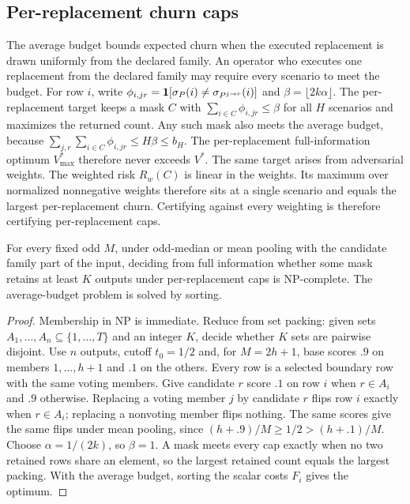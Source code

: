 \subsection{Per-replacement churn caps}
\label{app:per-replacement}

The average budget bounds expected churn when the executed replacement is drawn uniformly from the declared family. An operator who executes one replacement from the declared family may require every scenario to meet the budget. For row $i$, write $\phi_{i,jr}=\mathbf{1}[\sigma_P(i)\ne\sigma_{P^{j\to r}}(i)]$ and $\beta=\lfloor2k\alpha\rfloor$. The per-replacement target keeps a mask $C$ with $\sum_{i\in C}\phi_{i,jr}\le\beta$ for all $H$ scenarios and maximizes the returned count. Any such mask also meets the average budget, because $\sum_{j,r}\sum_{i\in C}\phi_{i,jr}\le H\beta\le b_H$. The per-replacement full-information optimum $V^*_{\max}$ therefore never exceeds $V^*$. The same target arises from adversarial weights. The weighted risk $R_w(C)$ is linear in the weights. Its maximum over normalized nonnegative weights therefore sits at a single scenario and equals the largest per-replacement churn. Certifying against every weighting is therefore certifying per-replacement caps.

\begin{proposition}
\label{prop:per-replacement-hard}
For every fixed odd $M$, under odd-median or mean pooling with the candidate family part of the input, deciding from full information whether some mask retains at least $K$ outputs under per-replacement caps is NP-complete. The average-budget problem is solved by sorting.
\end{proposition}
\begin{proof}
Membership in NP is immediate. Reduce from set packing: given sets $A_1,\ldots,A_n\subseteq\{1,\ldots,T\}$ and an integer $K$, decide whether $K$ sets are pairwise disjoint. Use $n$ outputs, cutoff $t_0=1/2$ and, for $M=2h+1$, base scores $.9$ on members $1,\ldots,h+1$ and $.1$ on the others. Every row is a selected boundary row with the same voting members. Give candidate $r$ score $.1$ on row $i$ when $r\in A_i$ and $.9$ otherwise. Replacing a voting member $j$ by candidate $r$ flips row $i$ exactly when $r\in A_i$; replacing a nonvoting member flips nothing. The same scores give the same flips under mean pooling, since $(h+.9)/M\ge1/2>(h+.1)/M$. Choose $\alpha=1/(2k)$, so $\beta=1$. A mask meets every cap exactly when no two retained rows share an element, so the largest retained count equals the largest packing. With the average budget, sorting the scalar costs $F_i$ gives the optimum.
\end{proof}

